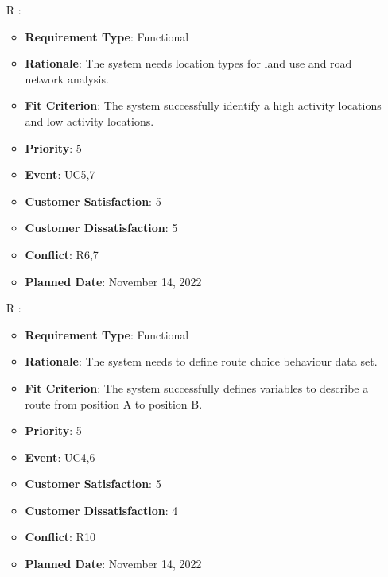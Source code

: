 \documentclass[12pt, titlepage]{article}
\newcounter{reqnum} %
\begin{document}
\begin{itemize}
\item[R\refstepcounter{reqnum}\thereqnum
\label{R_Inputs_1}:] 
\begin{itemize}
    \item \textbf{Requirement Type}: Functional
    \item \textbf{Rationale}: The system needs location types for land use and road network analysis.
    \item \textbf{Fit Criterion}: The system successfully identify a high activity locations and low activity locations. 
    \item \textbf{Priority}: 5
    \item \textbf{Event}: UC5,7
    \item \textbf{Customer Satisfaction}: 5
    \item \textbf{Customer Dissatisfaction}: 5
    \item \textbf{Conflict}: R6,7
    \item \textbf{Planned Date}: November 14, 2022
\end{itemize}

\item[R\refstepcounter{reqnum}\thereqnum
\label{R_Inputs_1}:] 
\begin{itemize}
    \item \textbf{Requirement Type}: Functional
    \item \textbf{Rationale}: The system needs to define route choice behaviour data set.
    \item \textbf{Fit Criterion}: The system successfully defines variables to describe a route from position A to position B.
    \item \textbf{Priority}: 5
    \item \textbf{Event}: UC4,6
    \item \textbf{Customer Satisfaction}: 5
    \item \textbf{Customer Dissatisfaction}: 4
    \item \textbf{Conflict}: R10
    \item \textbf{Planned Date}: November 14, 2022
\end{itemize}



\end{itemize}
\end{document}
